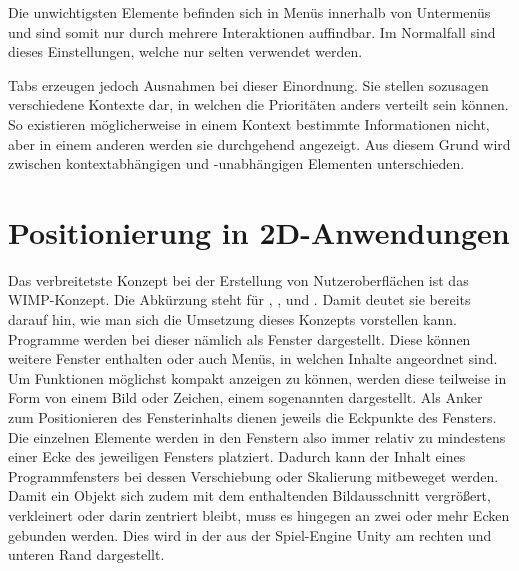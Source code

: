 		Die unwichtigsten Elemente befinden sich in Menüs innerhalb von Untermenüs und sind somit nur durch mehrere Interaktionen auffindbar. Im Normalfall sind dieses Einstellungen, welche nur selten verwendet werden.
		
		Tabs erzeugen jedoch Ausnahmen bei dieser Einordnung. Sie stellen sozusagen verschiedene Kontexte dar, in welchen die Prioritäten anders verteilt sein können. So existieren möglicherweise in einem Kontext bestimmte Informationen nicht, aber in einem anderen werden sie durchgehend angezeigt. Aus diesem Grund wird zwischen kontextabhängigen und -unabhängigen Elementen unterschieden.
		
		
	\section{Positionierung in 2D-Anwendungen}
		Das verbreitetste Konzept bei der Erstellung von Nutzeroberflächen ist das WIMP-Konzept. Die Abkürzung steht für , ,  und . 
		Damit deutet sie bereits darauf hin, wie man sich die Umsetzung dieses Konzepts vorstellen kann. Programme werden bei dieser nämlich als Fenster dargestellt. Diese können weitere Fenster enthalten oder auch Menüs, in welchen Inhalte angeordnet sind. Um Funktionen möglichst kompakt anzeigen zu können, werden diese teilweise in Form von einem Bild oder Zeichen, einem sogenannten  dargestellt.
		Als Anker zum Positionieren des Fensterinhalts dienen jeweils die Eckpunkte des Fensters. Die einzelnen Elemente werden in den Fenstern also immer relativ zu mindestens einer Ecke des jeweiligen Fensters platziert. Dadurch kann der Inhalt eines Programmfensters bei dessen Verschiebung oder Skalierung mitbeweget werden. Damit ein Objekt sich zudem mit dem enthaltenden Bildausschnitt vergrößert, verkleinert oder darin zentriert bleibt, muss es hingegen an zwei oder mehr Ecken gebunden werden. Dies wird in der  aus der Spiel-Engine Unity am rechten und unteren Rand dargestellt.
		
